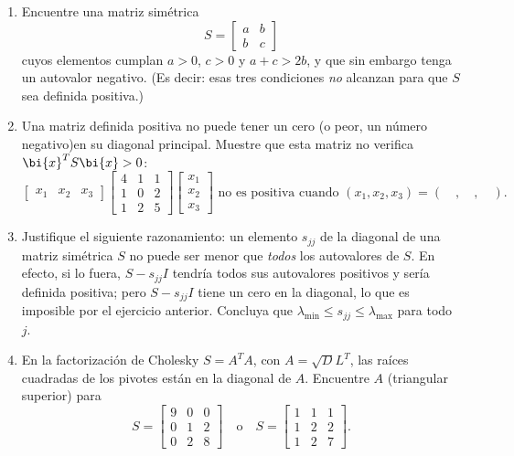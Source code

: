 \begin{enumerate}
\item Encuentre una matriz simétrica
\[ S=\begin{bmatrix}
  a&b\\ b&c
\end{bmatrix}
\]
cuyos elementos cumplan $a>0$, $c>0$ y $a+c>2b$, y que sin embargo tenga un
autovalor negativo. (Es decir: esas tres condiciones \emph{no} alcanzan para
que $S$ sea definida positiva.)

\item Una matriz definida positiva no puede tener un cero (o peor, un número negativo)\linebreak en su diagonal principal. Muestre que esta matriz no verifica $\bi{x}^T S \bi{x} > 0$:
\[\begin{bmatrix}x_1 & x_2 & x_3\end{bmatrix}
        \begin{bmatrix} 4&1&1\\ 1&0&2
        \\ 1&2&5  \end{bmatrix}
        \begin{bmatrix} x_1\\ x_2\\ x_3 \end{bmatrix}
        \text{ no es positiva cuando } (x_1,x_2,x_3)=(\quad
        ,\quad ,\quad ).
\]

\item Justifique el siguiente razonamiento: un elemento $s_{jj}$ de la diagonal
de una matriz simétrica $S$ no puede ser menor que \emph{todos} los autovalores
de $S$. En efecto, si lo fuera, $S-s_{jj}I$ tendría todos sus autovalores
positivos y sería definida positiva; pero $S-s_{jj}I$ tiene un cero en la
diagonal, lo que es imposible por el ejercicio anterior. Concluya que
$\lambda_{\min}\le s_{jj}\le\lambda_{\max}$ para todo $j$.

\item En la  factorización de Cholesky $S=A^T A$, con  $A=\sqrt{D}L^T$, las raíces cuadradas de los pivotes están en la diagonal de $A$. Encuentre $A$ (triangular superior) para
\[
S=\begin{bmatrix} 9&0&0\\ 0&1&2\\ 0&2&8\end{bmatrix} \quad\text{o}\quad
S=\begin{bmatrix} 1&1&1\\ 1&2&2\\ 1&2&7\end{bmatrix}.
\]


\end{enumerate}
